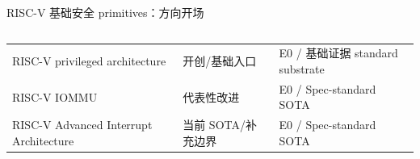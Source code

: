 \begin{frame}[t,shrink=6]{RISC-V 基础安全 primitives：方向开场}
\begin{columns}[T,totalwidth=\textwidth]
\begin{column}{0.49\textwidth}
{\begin{minipage}[t]{0.97\linewidth}
\begin{minipage}{0.92\linewidth}
{\begin{tabularx}{\linewidth}{@{}YYY@{}}
\midrule
RISC-V privileged architecture & 开创/基础入口 & E0 / 基础证据 standard substrate \\
RISC-V IOMMU & 代表性改进 & E0 / Spec-standard SOTA \\
RISC-V Advanced Interrupt Architecture & 当前 SOTA/补充边界 & E0 / Spec-standard SOTA \\
\bottomrule
\end{tabularx}
}
    \end{minipage}
    \vspace{1mm}
  \end{minipage}}
  \end{column}
\end{columns}
\end{frame}


